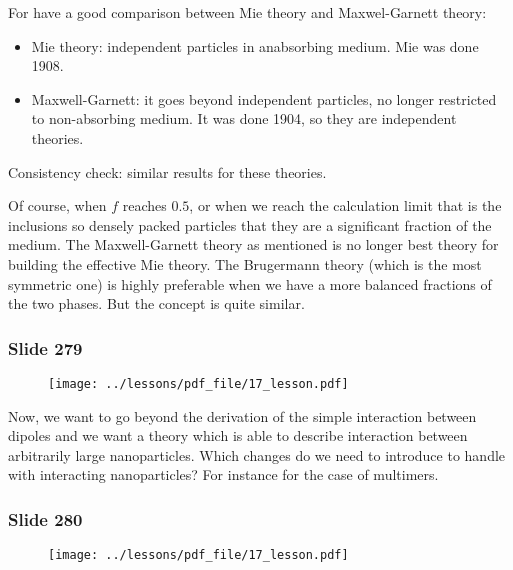 \documentclass[../main/main.tex]{subfiles}
\begin{document}
For have a good comparison between Mie theory and Maxwel-Garnett theory:
\begin{itemize}
\item Mie theory: independent particles in anabsorbing medium. Mie was done 1908.
\item Maxwell-Garnett: it goes beyond independent particles, no longer restricted to non-absorbing medium. It was done 1904, so they are independent theories.
\end{itemize}
Consistency check: similar results for these theories.

Of course, when $f$ reaches $0.5$, or when we reach the calculation limit that is the inclusions so densely packed particles that they are a significant fraction of the medium.
The Maxwell-Garnett theory as mentioned is no longer best theory for building the effective Mie theory. The Brugermann theory (which is the most symmetric one) is highly preferable when we have a more balanced fractions of the two phases. But the concept is quite similar.


\newpage

\subsubsection{Slide 279}

\begin{figure}[h!]
\centering
\texttt{[image: ../lessons/pdf\_file/17\_lesson.pdf]}
\end{figure}

Now, we want to go beyond the derivation of the simple interaction between dipoles and we want a theory which is able to describe interaction between arbitrarily large nanoparticles. Which changes do we need to introduce to handle with interacting nanoparticles? For instance for the case of multimers.

\newpage

\subsubsection{Slide 280}

\begin{figure}[h!]
\centering
\texttt{[image: ../lessons/pdf\_file/17\_lesson.pdf]}
\end{figure}
\end{document}
